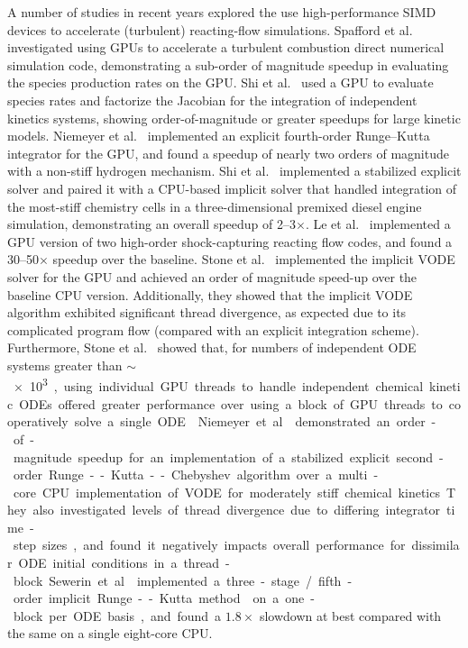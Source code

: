 \documentclass[preprint]{elsarticle}
\begin{document}
A number of studies in recent years explored the use high-performance SIMD devices to accelerate (turbulent) reacting-flow simulations.
Spafford et al.~\cite{Spafford:2010aa} investigated using GPUs to accelerate a turbulent combustion direct numerical simulation code, demonstrating a sub-order of magnitude speedup in evaluating the species production rates on the GPU.
Shi et al.~\cite{Shi:2011aa} used a GPU to evaluate species rates and factorize the Jacobian for the integration of independent kinetics systems, showing order-of-magnitude or greater speedups for large kinetic models.
Niemeyer et al.~\cite{Niemeyer:2011aa} implemented an explicit fourth-order Runge--Kutta integrator for the GPU, and found a speedup of nearly two orders of magnitude with a non-stiff hydrogen mechanism.
Shi et al.~\cite{Shi:2012aa} implemented a stabilized explicit solver and paired it with a CPU-based implicit solver that handled integration of the most-stiff chemistry cells in a three-dimensional premixed diesel engine simulation, demonstrating an overall speedup of \numrange{2}{3}$\times$.
Le et al.~\cite{Le2013596} implemented a GPU version of two high-order shock-capturing reacting flow codes, and found a \numrange{30}{50}$\times$ speedup over the baseline.
Stone et al.~\cite{Stone:2013aa} implemented the implicit VODE~\cite{Brown:1989vl} solver for the GPU and achieved an order of magnitude speed-up over the baseline CPU version.
Additionally, they showed that the implicit VODE algorithm exhibited significant thread divergence, as expected due to its complicated program flow (compared with an explicit integration scheme).
Furthermore, Stone et al.~\cite{Stone:2013aa} showed that, for numbers of independent ODE systems greater than $\sim$\SI{e3}, using individual GPU threads to handle independent chemical kinetic ODEs offered greater performance over using a block of GPU threads to cooperatively solve a single ODE~\cite{Stone:2013aa}.
Niemeyer et al.~\cite{Niemeyer:2014aa} demonstrated an order-of-magnitude speedup for an implementation of a stabilized explicit second-order Runge--Kutta--Chebyshev algorithm over a multi-core CPU implementation of VODE for moderately stiff chemical kinetics.
They also investigated levels of thread divergence due to differing integrator time-step sizes, and found it negatively impacts overall performance for dissimilar ODE initial conditions in a thread-block.
Sewerin et al.~\cite{Sewerin20151375} implemented a three-stage\slash fifth-order implicit Runge--Kutta method~\cite{wanner1991solving} on a one-block per ODE basis, and found a $1.8\times$ slowdown at best compared with the same on a single eight-core CPU.
\end{document}
